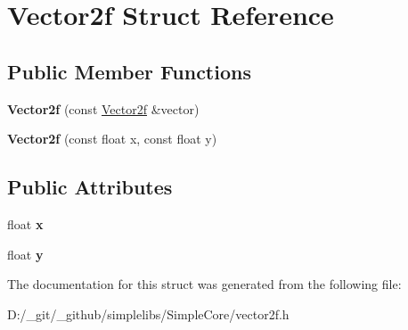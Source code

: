 \hypertarget{struct_vector2f}{}\section{Vector2f Struct Reference}
\label{struct_vector2f}
\subsection*{Public Member Functions}
\begin{DoxyCompactItemize}
\item 
\mbox{\label{struct_vector2f_a6763fd794754c51c988c1092cd8042f3}} 
{\bfseries Vector2f} (const \mbox{\hyperlink{struct_vector2f}{Vector2f}} \&vector)
\item 
\mbox{\label{struct_vector2f_aa335d5db4c69f331a38518b4075cb7f4}} 
{\bfseries Vector2f} (const float x, const float y)
\end{DoxyCompactItemize}
\subsection*{Public Attributes}
\begin{DoxyCompactItemize}
\item 
\mbox{\label{struct_vector2f_add58d2378e3a3abdb76cf0ac51c9acfc}} 
float {\bfseries x}
\item 
\mbox{\label{struct_vector2f_a14874a72597fd358b15f8ba34b999c4d}} 
float {\bfseries y}
\end{DoxyCompactItemize}


The documentation for this struct was generated from the following file\+:\begin{DoxyCompactItemize}
\item 
D\+:/\+\_\+git/\+\_\+github/simplelibs/\+Simple\+Core/vector2f.\+h\end{DoxyCompactItemize}
